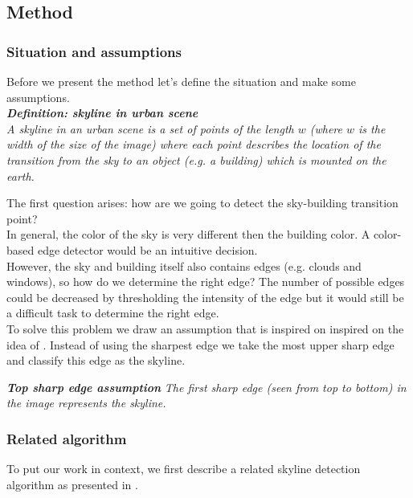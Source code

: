 \subsection{Method} %
\subsubsection{Situation and assumptions}
Before we present the method let's define the situation and make some
assumptions.\\

\textbf{\emph{Definition: skyline in urban scene}}\\
\emph{A skyline in an urban scene is a set of points of the length $w$ (where $w$ is the
width of the size of the image) where each point describes the location of the
transition from the sky to an object (e.g. a building) which is mounted on the
earth.}

The first question arises: how are we going to detect the sky-building
transition point?\\ In general, the color of the sky is very different then the building color. A
color-based edge detector would be an intuitive decision.\\
However, the sky and building itself also contains edges (e.g. clouds and 
windows), so how do we determine the right edge?
The number of possible edges could be decreased by thresholding the intensity of
the edge but it would still be a difficult task to determine the right edge.\\


To solve this problem we draw an assumption that is inspired on inspired on the
idea of \cite{Rover}. Instead of using the sharpest edge we take the most upper sharp
edge and classify this edge as the skyline.

\textbf{\emph{Top sharp edge assumption}}
\emph{The first sharp edge (seen from top to bottom) in the image 
represents the skyline.}




\subsubsection{Related algorithm}
To put our work in context, we first describe a related skyline detection algorithm as presented in \cite{Rover}.\\

